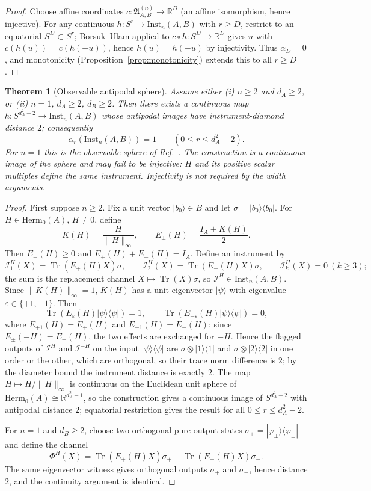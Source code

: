 \documentclass[11pt,a4paper]{article}
\newtheorem{theorem}{Theorem}[section]
\newcommand{\Herm}{\mathrm{Herm}}
\newcommand{\Inst}{\mathrm{Inst}}
\newcommand{\Tr}{\operatorname{Tr}}
\begin{document}
\begin{proof}
Choose affine coordinates $c:\mathfrak A_{A,B}^{(n)}\to\mathbb R^{D}$ (an affine isomorphism, hence injective). For any continuous $h:S^r\to\Inst_n(A,B)$ with $r\ge D$, restrict to an equatorial $S^D\subset S^r$; Borsuk--Ulam applied to $c\circ h:S^D\to\mathbb R^D$ gives $u$ with $c(h(u))=c(h(-u))$, hence $h(u)=h(-u)$ by injectivity. Thus $\alpha_D=0$, and monotonicity (Proposition~\ref{prop:monotonicity}) extends this to all $r\ge D$.
\end{proof}

\begin{theorem}[Observable antipodal sphere]
\label{thm:observable}
Assume either (i) $n\ge2$ and $d_A\ge2$, or (ii) $n=1$, $d_A\ge2$, $d_B\ge2$. Then there exists a continuous map $h:S^{d_A^2-2}\to\Inst_n(A,B)$ whose antipodal images have instrument-diamond distance $2$; consequently
\[
\alpha_r(\Inst_n(A,B))=1\qquad(0\le r\le d_A^2-2).
\]
For $n=1$ this is the observable sphere of Ref.~\cite{CompanionChannels}. The construction is a continuous image of the sphere and may fail to be injective: $H$ and its positive scalar multiples define the same instrument. Injectivity is not required by the width arguments.
\end{theorem}

\begin{proof}
First suppose $n\ge2$. Fix a unit vector $|b_0\rangle\in B$ and let $\sigma=|b_0\rangle\langle b_0|$. For $H\in\Herm_0(A)$, $H\neq0$, define
\[
K(H)=\frac{H}{\|H\|_\infty},\qquad E_\pm(H)=\frac{I_A\pm K(H)}2.
\]
Then $E_\pm(H)\ge0$ and $E_+(H)+E_-(H)=I_A$. Define an instrument by
\[
\mathcal I^H_1(X)=\Tr(E_+(H)X)\sigma,\qquad
\mathcal I^H_2(X)=\Tr(E_-(H)X)\sigma,\qquad
\mathcal I^H_k(X)=0\ (k\ge3);
\]
the sum is the replacement channel $X\mapsto\Tr(X)\sigma$, so $\mathcal I^H\in\Inst_n(A,B)$. Since $\|K(H)\|_\infty=1$, $K(H)$ has a unit eigenvector $|\psi\rangle$ with eigenvalue $\varepsilon\in\{+1,-1\}$. Then
\[
\Tr(E_{\varepsilon}(H)|\psi\rangle\langle\psi|)=1,\qquad
\Tr(E_{-\varepsilon}(H)|\psi\rangle\langle\psi|)=0,
\]
where $E_{+1}(H)=E_+(H)$ and $E_{-1}(H)=E_-(H)$; since $E_\pm(-H)=E_\mp(H)$, the two effects are exchanged for $-H$. Hence the flagged outputs of $\mathcal I^H$ and $\mathcal I^{-H}$ on the input $|\psi\rangle\langle\psi|$ are $\sigma\otimes|1\rangle\langle1|$ and $\sigma\otimes|2\rangle\langle2|$ in one order or the other, which are orthogonal, so their trace norm difference is $2$; by the diameter bound the instrument distance is exactly $2$. The map $H\mapsto H/\|H\|_\infty$ is continuous on the Euclidean unit sphere of $\Herm_0(A)\cong\mathbb R^{d_A^2-1}$, so the construction gives a continuous image of $S^{d_A^2-2}$ with antipodal distance $2$; equatorial restriction gives the result for all $0\le r\le d_A^2-2$.

For $n=1$ and $d_B\ge2$, choose two orthogonal pure output states $\sigma_\pm=|\varphi_\pm\rangle\langle\varphi_\pm|$ and define the channel
\[
\Phi^H(X)=\Tr(E_+(H)X)\sigma_++\Tr(E_-(H)X)\sigma_-.
\]
The same eigenvector witness gives orthogonal outputs $\sigma_+$ and $\sigma_-$, hence distance $2$, and the continuity argument is identical.
\end{proof}
\end{document}
